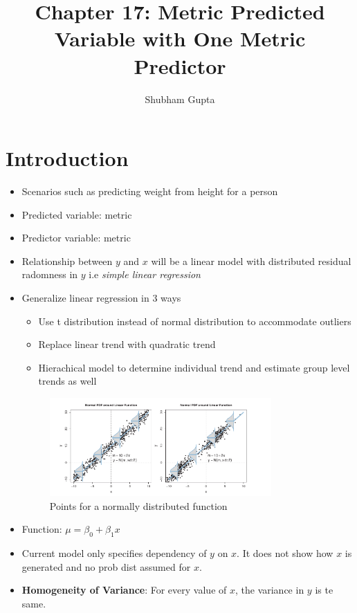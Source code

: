 \documentclass[a4paper]{article}
\title{Chapter 17: Metric Predicted Variable with One Metric Predictor}
\author{Shubham Gupta}
\begin{document}
\maketitle

\section{Introduction}
\begin{itemize}
    \item Scenarios such as predicting weight from height for a person
    \item Predicted variable: metric
    \item Predictor variable: metric
    \item Relationship between $y$ and $x$ will be a linear model with distributed residual radomness in $y$ i.e \textit{simple linear regression} 
    \item Generalize linear regression in 3 ways
        \begin{itemize}
            \item Use t distribution instead of normal distribution to accommodate outliers
            \item Replace linear trend with quadratic trend
            \item Hierachical model to determine individual trend and estimate group level trends as well
        \end{itemize}
        \begin{figure}[H]
            \centering
            \includegraphics[width=0.8\textwidth]{normal_function}
            \caption{Points for a normally distributed function}
            \label{fig:normal_function}
        \end{figure}
    \item Function: $\mu = \beta_0 + \beta_1x$
    \item Current model only specifies dependency of $y$ on $x$. It does not show how $x$ is generated and no prob dist assumed for $x$.
    \item \textbf{Homogeneity of Variance}: For every value of $x$, the variance in $y$ is te same.  
\end{itemize}
\end{document}
